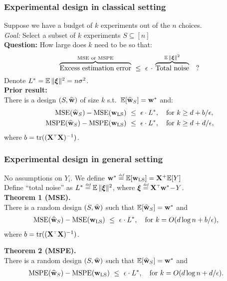 \documentclass{beamer}
\begin{document}
\begin{frame}
  \frametitle{Experimental design in classical setting}
  Suppose we have a budget of $k$ experiments out of the $n$
  choices.\\
  \textit{Goal:} Select a subset of $k$ experiments
  $S\subseteq [n]$\\
  \textbf{Question:} How large does $k$ need to be so that:
  \[\overbrace{\text{Excess estimation error}}^{\text{MSE or MSPE}}
    \ \leq\  \epsilon\,\cdot\,
    \overbrace{\text{Total noise}}^{\mathbb E\,\|\boldsymbol\xi\|^2}\quad ?\]
 Denote $L^*=\mathbb E\,\|\boldsymbol\xi\|^2 = n\sigma^2$.\\[3mm]
 \textbf{Prior result:} \\
   There is a design $(S,\widehat{\mathbf w})$ of size $k$ s.t.~$\mathbb E[\widehat{\mathbf w}_S]=\mathbf w^*$ and:
  \begin{align*}
\text{MSE}(\widehat{\mathbf w}_S) - \text{MSE}(\mathbf w_{\mathrm{LS}})
    \ &\leq\ \epsilon\cdot
      L^*,\quad\text{for }k\geq  d+ b/\epsilon,\\
\text{MSPE}(\widehat{\mathbf w}_S)-\text{MSPE}(\mathbf w_{\mathrm{LS}})
\ &\leq\ \epsilon\cdot L^*,\quad\text{for }k\geq  d + d/\epsilon,
  \end{align*}
  where $b = \tr((\X^\top\X)^{-1})$.
\end{frame}

\begin{frame}
  \frametitle{Experimental design in general setting}
  
No assumptions on $Y_i$. We define
  $\mathbf w^* \stackrel{\textit{\tiny{def}}}{=}\mathbb E[\mathbf w_{\mathrm{LS}}]=\mathbf X^+\mathbb E[Y]$\\
Define ``total noise'' as $L^* \stackrel{\textit{\tiny{def}}}{=} \mathbb E\,\|\boldsymbol\xi\|^2$, where $\xib\defeq
  \X^\top\w^*\!-\!Y$.\\[6mm] 

  \textbf{Theorem 1 (MSE).}\\
  There is a random design $(S,\widehat{\mathbf w})$ such that $\mathbb E[\widehat{\mathbf w}_S]=\mathbf w^*$ and
\begin{align*}
\text{MSE}(\widehat{\mathbf w}_S) - \text{MSE}(\mathbf w_{\mathrm{LS}})
    \ &\leq\ \epsilon\cdot
      L^*,\quad\text{for }k=O(d\log n + b/\epsilon),
\end{align*}
where $b=\tr((\X^\top\X)^{-1})$.
\vspace{6mm}

  \textbf{Theorem 2 (MSPE).}\\
  There is a random design $(S,\widehat{\mathbf w})$ such that $\mathbb E[\widehat{\mathbf w}_S]=\mathbf w^*$ and
\begin{align*}
\text{MSPE}(\widehat{\mathbf w}_S) - \text{MSPE}(\mathbf w_{\mathrm{LS}})
    \ &\leq\ \epsilon\cdot
  L^*,\quad\text{for }k=O(d\log n + d/\epsilon).
\end{align*}
\end{frame}
\end{document}
